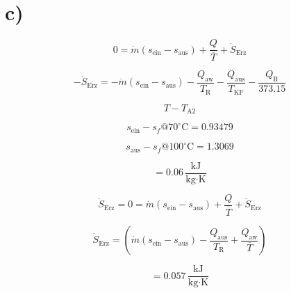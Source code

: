 

\section*{c)}

\[
0 = \dot{m} (s_{\text{ein}} - s_{\text{aus}}) + \frac{Q}{\overline{T}} + \dot{S}_{\text{Erz}}
\]

\[
-\dot{S}_{\text{Erz}} = -\dot{m} (s_{\text{ein}} - s_{\text{aus}}) - \frac{Q_{\text{aw}}}{T_{\text{R}}} - \frac{Q_{\text{aus}}}{T_{\text{KF}}} - \frac{Q_{\text{R}}}{373.15}
\]

\[
T - T_{\text{A2}}
\]

\[
s_{\text{ein}} - s_f @ 70^\circ \text{C} = 0.93479
\]

\[
s_{\text{aus}} - s_f @ 100^\circ \text{C} = 1.3069
\]

\[
= 0.06 \, \frac{\text{kJ}}{\text{kg} \cdot \text{K}}
\]

\[
\dot{S}_{\text{Erz}} = 0 = \dot{m} (s_{\text{ein}} - s_{\text{aus}}) + \frac{Q}{\overline{T}} + \dot{S}_{\text{Erz}}
\]

\[
\dot{S}_{\text{Erz}} = \left( \dot{m} (s_{\text{ein}} - s_{\text{aus}}) - \frac{Q_{\text{aus}}}{T_{\text{R}}} + \frac{Q_{\text{aw}}}{\overline{T}} \right)
\]

\[
= 0.057 \, \frac{\text{kJ}}{\text{kg} \cdot \text{K}}
\]